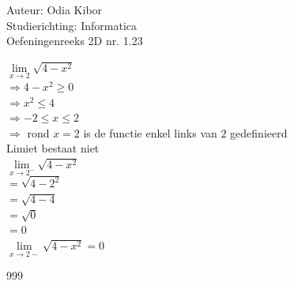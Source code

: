 \documentclass[a4paper]{article}
\begin{document}
  
\noindent \large Auteur: Odia Kibor \\
\noindent \large Studierichting: Informatica\\
\noindent \large Oefeningenreeks 2D nr. 1.23\\

\medskip

\normalsize


$\lim\limits_{x \rightarrow 2} \sqrt{4 - x^2}$\\

$\Rightarrow 4 - x^2 \geq 0$\\

$\Rightarrow x^2 \leq 4$\\

$\Rightarrow -2 \leq x \leq 2$\\

$\Rightarrow$ rond $x=2$ is de functie enkel links van $2$ gedefinieerd\\

Limiet bestaat niet\\

$\lim\limits_{x \rightarrow 2^-} \sqrt{4 - x^2}$\\

$= \sqrt{4 - 2^2}$\\

$= \sqrt{4 - 4}$\\

$= \sqrt{0}$\\

$= 0$\\

$\lim\limits_{x \rightarrow 2-} \sqrt{4 - x^2} = 0$












\begin{thebibliography}{999}
\end{thebibliography}
\end{document}
